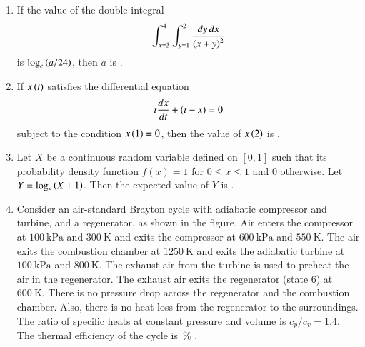 \documentclass[journal]{IEEEtran}
\begin{document}
\begin{enumerate}[leftmargin=0pt]
\hfill{}

\vspace{4mm}

\item
If the value of the double integral
\[
\int_{x=3}^{4}\int_{y=1}^{2}\frac{dy\,dx}{\left(x+y\right)^2}
\]
is $\log_e\left(a/24\right)$, then $a$ is \underline{\hspace{2cm}} .

\hfill{}

\vspace{4mm}

\item
If $x\left(t\right)$ satisfies the differential equation
\[
t\frac{dx}{dt} + \left(t - x\right) = 0
\]
subject to the condition $x\left(1\right) = 0$, then the value of $x\left(2\right)$ is \underline{\hspace{2cm}} .

\hfill{}

\item
Let $X$ be a continuous random variable defined on $[0, 1]$ such that its probability density function $f(x) = 1$ for $0 \leq x \leq 1$ and $0$ otherwise. Let $Y = \log_e \left(X + 1\right)$. Then the expected value of $Y$ is \underline{\hspace{2cm}} .

\hfill{}

\vspace{4mm}

\item
Consider an air-standard Brayton cycle with adiabatic compressor and turbine, and a regenerator, as shown in the figure. Air enters the compressor at $100~\text{kPa}$ and $300~\text{K}$ and exits the compressor at $600~\text{kPa}$ and $550~\text{K}$. The air exits the combustion chamber at $1250~\text{K}$ and exits the adiabatic turbine at $100~\text{kPa}$ and $800~\text{K}$. The exhaust air from the turbine is used to preheat the air in the regenerator. The exhaust air exits the regenerator (state 6) at $600~\text{K}$. There is no pressure drop across the regenerator and the combustion chamber. Also, there is no heat loss from the regenerator to the surroundings. The ratio of specific heats at constant pressure and volume is $c_p/c_v = 1.4$. The thermal efficiency of the cycle is \underline{\hspace{2cm}}\,\% .


\end{enumerate}
\end{document}
